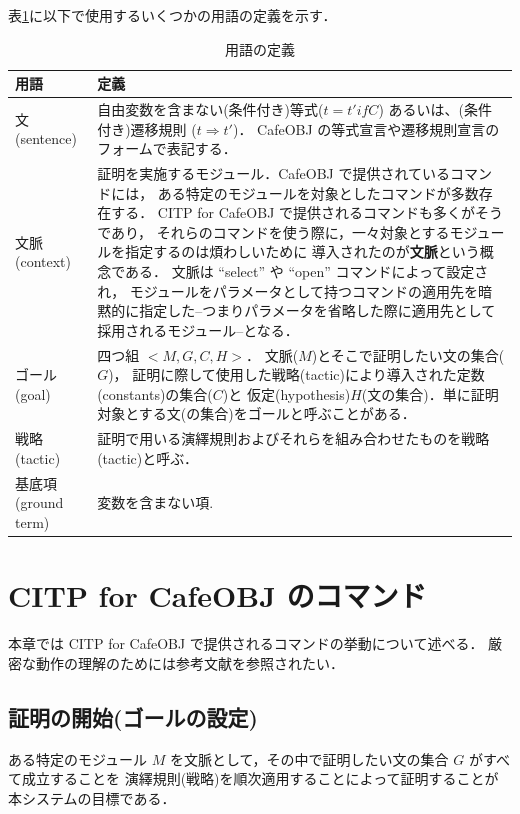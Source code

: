 \documentclass[a4paper,oneside,10pt,here]{memoir}
\begin{document}
表\ref{table:terms}に以下で使用するいくつかの用語の定義を示す．
\begin{table}
\caption{用語の定義}
\label{table:terms}
\begin{center}
\begin{tabular}[htb]{|l|p{}|}\hline
用語 & 定義 \\\hline\hline
文(sentence)   & 自由変数を含まない(条件付き)等式($t = t' if C$) あるいは、(条件付き)遷移規則 ($t \Rightarrow t'$)．
CafeOBJ の等式宣言や遷移規則宣言のフォームで表記する． \\\hline 
文脈(context) & 証明を実施するモジュール．CafeOBJ で提供されているコマンドには，
ある特定のモジュールを対象としたコマンドが多数存在する．
CITP for CafeOBJ で提供されるコマンドも多くがそうであり，
それらのコマンドを使う際に，一々対象とするモジュールを指定するのは煩わしいために%
導入されたのが\textbf{文脈}という概念である．
文脈は ``select'' や ``open'' コマンドによって設定され，
モジュールをパラメータとして持つコマンドの適用先を暗黙的に指定した--つまりパラメータを省略した際に適用先として%
採用されるモジュール--となる．
\\\hline
ゴール(goal) & 四つ組 $<M,G,C,H>$． 文脈($M$)とそこで証明したい文の集合($G$)，
証明に際して使用した戦略(tactic)により導入された定数(constants)の集合($C$)と
仮定(hypothesis)$H$(文の集合)．単に証明対象とする文(の集合)をゴールと呼ぶことがある．\\\hline
戦略(tactic) & 証明で用いる演繹規則およびそれらを組み合わせたものを戦略(tactic)と呼ぶ．\\\hline
基底項(ground term) & 変数を含まない項. \\\hline
\end{tabular}
\end{center}
\end{table}


\chapter{CITP for CafeOBJ のコマンド}\label{chap:new-commands}
本章では CITP for CafeOBJ で提供されるコマンドの挙動について述べる．
厳密な動作の理解のためには参考文献を参照されたい．
\section{証明の開始(ゴールの設定)} \label{sec:start-proof}
ある特定のモジュール $M$ を文脈として，その中で証明したい文の集合 $G$ がすべて成立することを%
演繹規則(戦略)を順次適用することによって証明することが本システムの目標である．
\end{document}
